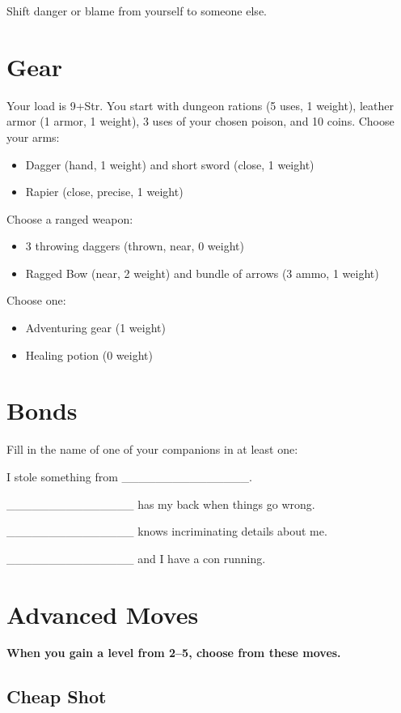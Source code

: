  Shift danger or blame from yourself to someone else.
\section*{Gear}


 Your load is 9+Str. You start with dungeon rations (5 uses, 1 weight), leather armor (1 armor, 1 weight), 3 uses of your chosen poison, and 10 coins. Choose your arms:
\begin{itemize}
\item Dagger (hand, 1 weight) and short sword (close, 1 weight)
\item Rapier (close, precise, 1 weight)

\end{itemize}


 Choose a ranged weapon:
\begin{itemize}
\item 3 throwing daggers (thrown, near, 0 weight)
\item Ragged Bow (near, 2 weight) and bundle of arrows (3 ammo, 1 weight)

\end{itemize}


 Choose one:
\begin{itemize}
\item Adventuring gear (1 weight)
\item Healing potion (0 weight)

\end{itemize}
\section*{Bonds}


 Fill in the name of one of your companions in at least one:


 I stole something from \_\_\_\_\_\_\_\_\_\_\_\_\_\_\_.


 \_\_\_\_\_\_\_\_\_\_\_\_\_\_\_ has my back when things go wrong.


 \_\_\_\_\_\_\_\_\_\_\_\_\_\_\_ knows incriminating details about me.


 \_\_\_\_\_\_\_\_\_\_\_\_\_\_\_ and I have a con running.
\section*{Advanced Moves}


 {\bfseries When you gain a level from 2--5, choose from these moves.}
\subsection{Cheap Shot}


